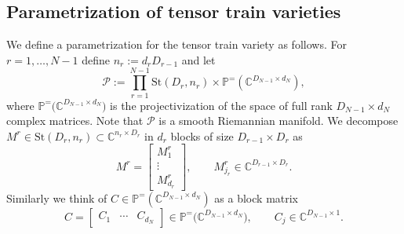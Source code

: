 \documentclass{article}
\theoremstyle{definition}
\newcommand{\C}{\mathbb{C}}
\newcommand{\St}{\mathrm{St}}
\renewcommand{\P}{\mathbb{P}}
\begin{document}
\subsection{Parametrization of tensor train varieties}\label{sec:pre_parametrization}
We define a parametrization for the tensor train variety as follows. For $r=1,\dots,N-1$ define $n_r:= d_r D_{r-1}$ and let
\[
\mathcal P
:=
\prod_{r=1}^{N-1}\St(D_r,n_r)
\times
\P^=\!\left(\C^{D_{N-1}\times d_N}\right),
\]
where $\P^{=}\!\bigl(\C^{D_{N-1}\times d_N}\bigr)$ is the projectivization of the space of full rank $D_{N-1}\times d_N$ complex matrices. Note that $\mathcal P$ is a smooth Riemannian manifold.
We decompose $M^r \in \St(D_r,n_r) \subset \C^{n_r\times D_r}$ in $d_r$ blocks of size $D_{r-1}\times D_r$ as
\begin{equation}\label{eq:stiefelblocks}
M^r=
\begin{bmatrix}
M^r_1\\
\vdots\\
M^r_{d_r}
\end{bmatrix},
\qquad
M^r_{j_r}\in \C^{D_{r-1}\times D_r}.
\end{equation}
Similarly we think of $C \in \P^=(\C^{D_{N-1}\times d_N})$ as a block matrix
\[
C=
\begin{bmatrix}
C_1 & \cdots & C_{d_N}
\end{bmatrix} \in \P^{=}\!\bigl(\C^{D_{N-1}\times d_N}\bigr),
\qquad
C_j\in \C^{D_{N-1}\times 1}.
\]
\end{document}
